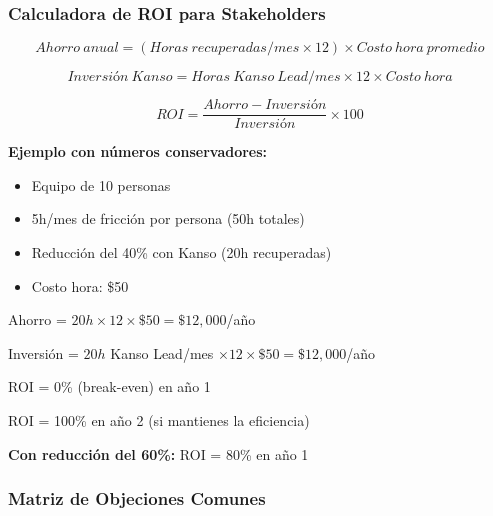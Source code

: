 \subsubsection*{Calculadora de ROI para Stakeholders}

\[
Ahorro\ anual = (Horas\ recuperadas/mes \times 12) \times Costo\ hora\ promedio
\]

\[
Inversión\ Kanso = Horas\ Kanso\ Lead/mes \times 12 \times Costo\ hora
\]

\[
ROI = \frac{Ahorro - Inversión}{Inversión} \times 100
\]

\textbf{Ejemplo con números conservadores:}
\begin{itemize}
    \item Equipo de 10 personas
    \item 5h/mes de fricción por persona (50h totales)
    \item Reducción del 40\% con Kanso (20h recuperadas)
    \item Costo hora: \$50
\end{itemize}

\begin{center}
Ahorro = $20h \times 12 \times \$50 = \$12{,}000$/año
\end{center}

\begin{center}
Inversión = $20h$ Kanso Lead/mes $\times 12 \times \$50 = \$12{,}000$/año
\end{center}

\begin{center}
ROI = 0\% (break-even) en año 1
\end{center}

\begin{center}
ROI = 100\% en año 2 (si mantienes la eficiencia)
\end{center}

\textbf{Con reducción del 60\%:}
ROI = 80\% en año 1

\subsubsection*{Matriz de Objeciones Comunes}

